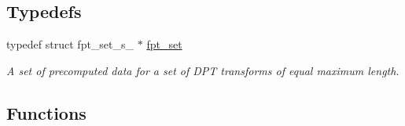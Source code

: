 \subsection*{Typedefs}
\begin{CompactItemize}
\item 
typedef struct fpt\_\-set\_\-s\_\- $\ast$ \hyperlink{group__fpt_g73d630ac21d6474ba0693f124d465e15}{fpt\_\-set}
\begin{CompactList}\small\item\em A set of precomputed data for a set of DPT transforms of equal maximum length. \item\end{CompactList}\end{CompactItemize}
\subsection*{Functions}
